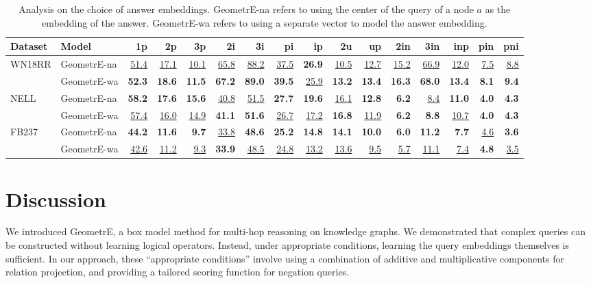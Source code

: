 \documentclass[runningheads]{llncs}
\newcommand{\f}[1]{\textbf{#1}}
\newcommand{\s}[1]{\underline{#1}}
\newcommand{\method}{GeometrE}
\begin{document}
\begin{table}[htbp]
  \small
  \centering
  \caption{Analysis on the choice of answer embeddings. \method{}-na
    refers to using the center of the query of a node $a$ as the
    embedding of the answer. \method-wa refers to using a separate
    vector to model the answer embedding.}
\begin{adjustbox}{width=0.99\textwidth}
  \begin{tabular}{llrrrrrrrrrrrrrr}
    \toprule
    Dataset& Model&1p&2p&3p&2i&3i&pi&ip&2u&up&2in&3in&inp&pin&pni \\
    \midrule
    \multirow{2}{*}{WN18RR} & \method{}-na & \s{51.4} & \s{17.1} & \s{10.1} & \s{65.8} & \s{88.2} & \s{37.5} & \f{26.9} & \s{10.5} & \s{12.7} & \s{15.2} & \s{66.9} & \s{12.0} & \s{7.5} & \s{8.8} \\
& \method{}-wa & \f{52.3} & \f{18.6} & \f{11.5} & \f{67.2} & \f{89.0} & \f{39.5} & \s{25.9} & \f{13.2} & \f{13.4} & \f{16.3} & \f{68.0} & \f{13.4} & \f{8.1} & \f{9.4} \\
    \midrule
    \multirow{2}{*}{NELL} & \method{}-na & \f{58.2} & \f{17.6} & \f{15.6} & \s{40.8} & \s{51.5} & \f{27.7} & \f{19.6} & \s{16.1} & \f{12.8} & \f{6.2} & \s{8.4} & \f{11.0} & \f{4.0} & \f{4.3} \\
& \method{}-wa & \s{57.4} & \s{16.0} & \s{14.9} & \f{41.1} & \f{51.6} & \s{26.7} & \s{17.2} & \f{16.8} & \s{11.9} & \f{6.2} & \f{8.8} & \s{10.7} & \f{4.0} & \f{4.3} \\
    \midrule
    \multirow{2}{*}{FB237} & \method{}-na & \f{44.2} & \f{11.6} & \f{9.7} & \s{33.8} & \f{48.6} & \f{25.2} & \f{14.8} & \f{14.1} & \f{10.0} & \f{6.0} & \f{11.2} & \f{7.7} & \s{4.6} & \f{3.6} \\
& \method{}-wa & \s{42.6} & \s{11.2} & \s{9.3} & \f{33.9} & \s{48.5} & \s{24.8} & \s{13.2} & \s{13.6} & \s{9.5} & \s{5.7} & \s{11.1} & \s{7.4} & \f{4.8} & \s{3.5} \\
    \bottomrule
  \end{tabular}
\end{adjustbox}
  \label{tab:answer_embeddings}
\end{table}




\section{Discussion}
We introduced \method{}, a box model method for multi-hop reasoning on
knowledge graphs. We demonstrated that complex queries can be
constructed without learning logical operators. Instead, under
appropriate conditions, learning the query embeddings themselves is
sufficient. In our approach, these ``appropriate conditions'' involve
using a combination of additive and multiplicative components for
relation projection, and providing a tailored scoring function for
negation queries.
\end{document}
